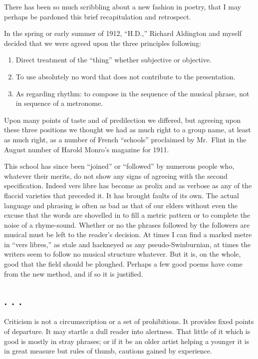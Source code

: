 There has been so much scribbling about a new fashion in poetry, that I
may perhaps be pardoned this brief recapitulation and retrospect.

In the spring or early summer of 1912, ``H.D.,'' Richard Aldington and
myself decided that we were agreed upon the three principles following:

\begin{enumerate}
\def\labelenumi{\arabic{enumi}.}
\itemsep1pt\parskip0pt
\item
  Direct treatment of the ``thing'' whether subjective or objective.
\item
  To use absolutely no word that does not contribute to the
  presentation.
\item
  As regarding rhythm: to compose in the sequence of the musical phrase,
  not in sequence of a metronome.
\end{enumerate}

Upon many points of taste and of predilection we differed, but agreeing
upon these three positions we thought we had as much right to a group
name, at least as much right, as a number of French ``schools''
proclaimed by Mr.~Flint in the August number of Harold Monro's magazine
for 1911.

This school has since been ``joined'' or ``followed'' by numerous people
who, whatever their merits, do not show any signs of agreeing with the
second specification. Indeed vers libre has become as prolix and as
verbose as any of the flaccid varieties that preceded it. It has brought
faults of its own. The actual language and phrasing is often as bad as
that of our elders without even the excuse that the words are shovelled
in to fill a metric pattern or to complete the noise of a rhyme-sound.
Whether or no the phrases followed by the followers are musical must be
left to the reader's decision. At times I can find a marked metre in
``vers libres,'' as stale and hackneyed as any pseudo-Swinburnian, at
times the writers seem to follow no musical structure whatever. But it
is, on the whole, good that the field should be ploughed. Perhaps a few
good poems have come from the new method, and if so it is justified.

\subsection{. . .}\label{section}

Criticism is not a circumscription or a set of prohibitions. It provides
fixed points of departure. It may startle a dull reader into alertness.
That little of it which is good is mostly in stray phrases; or if it be
an older artist helping a younger it is in great measure but rules of
thumb, cautions gained by experience.

